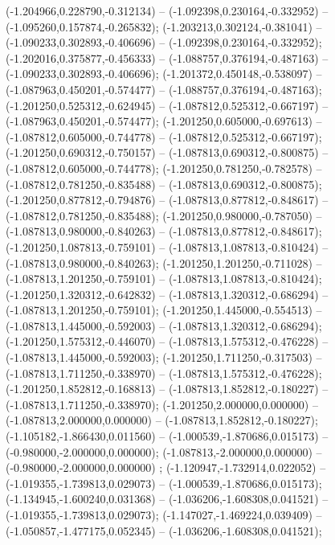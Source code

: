  (-1.204966,0.228790,-0.312134) -- (-1.092398,0.230164,-0.332952) -- (-1.095260,0.157874,-0.265832);
 (-1.203213,0.302124,-0.381041) -- (-1.090233,0.302893,-0.406696) -- (-1.092398,0.230164,-0.332952);
 (-1.202016,0.375877,-0.456333) -- (-1.088757,0.376194,-0.487163) -- (-1.090233,0.302893,-0.406696);
 (-1.201372,0.450148,-0.538097) -- (-1.087963,0.450201,-0.574477) -- (-1.088757,0.376194,-0.487163);
 (-1.201250,0.525312,-0.624945) -- (-1.087812,0.525312,-0.667197) -- (-1.087963,0.450201,-0.574477);
 (-1.201250,0.605000,-0.697613) -- (-1.087812,0.605000,-0.744778) -- (-1.087812,0.525312,-0.667197);
 (-1.201250,0.690312,-0.750157) -- (-1.087813,0.690312,-0.800875) -- (-1.087812,0.605000,-0.744778);
 (-1.201250,0.781250,-0.782578) -- (-1.087812,0.781250,-0.835488) -- (-1.087813,0.690312,-0.800875);
 (-1.201250,0.877812,-0.794876) -- (-1.087813,0.877812,-0.848617) -- (-1.087812,0.781250,-0.835488);
 (-1.201250,0.980000,-0.787050) -- (-1.087813,0.980000,-0.840263) -- (-1.087813,0.877812,-0.848617);
 (-1.201250,1.087813,-0.759101) -- (-1.087813,1.087813,-0.810424) -- (-1.087813,0.980000,-0.840263);
 (-1.201250,1.201250,-0.711028) -- (-1.087813,1.201250,-0.759101) -- (-1.087813,1.087813,-0.810424);
 (-1.201250,1.320312,-0.642832) -- (-1.087813,1.320312,-0.686294) -- (-1.087813,1.201250,-0.759101);
 (-1.201250,1.445000,-0.554513) -- (-1.087813,1.445000,-0.592003) -- (-1.087813,1.320312,-0.686294);
 (-1.201250,1.575312,-0.446070) -- (-1.087813,1.575312,-0.476228) -- (-1.087813,1.445000,-0.592003);
 (-1.201250,1.711250,-0.317503) -- (-1.087813,1.711250,-0.338970) -- (-1.087813,1.575312,-0.476228);
 (-1.201250,1.852812,-0.168813) -- (-1.087813,1.852812,-0.180227) -- (-1.087813,1.711250,-0.338970);
 (-1.201250,2.000000,0.000000) -- (-1.087813,2.000000,0.000000) -- (-1.087813,1.852812,-0.180227);
 (-1.105182,-1.866430,0.011560) -- (-1.000539,-1.870686,0.015173) -- (-0.980000,-2.000000,0.000000);
 (-1.087813,-2.000000,0.000000) -- (-0.980000,-2.000000,0.000000) ;
 (-1.120947,-1.732914,0.022052) -- (-1.019355,-1.739813,0.029073) -- (-1.000539,-1.870686,0.015173);
 (-1.134945,-1.600240,0.031368) -- (-1.036206,-1.608308,0.041521) -- (-1.019355,-1.739813,0.029073);
 (-1.147027,-1.469224,0.039409) -- (-1.050857,-1.477175,0.052345) -- (-1.036206,-1.608308,0.041521);
